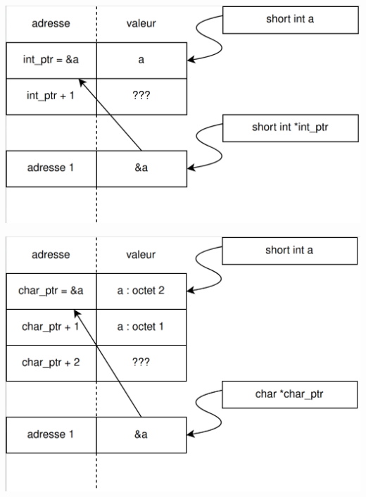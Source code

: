 \documentclass[../../../main.tex]{subfiles}
\begin{document}
\begin{minipage}{0.5\textwidth}
\begin{center}
		\includegraphics[width=\textwidth]{pointeur2}
	\end{center}
\end{minipage}
\begin{minipage}{0.5\textwidth}
\begin{center}
		\includegraphics[width=\textwidth]{pointeur3}
	\end{center}
\end{minipage}
 
\end{document}
